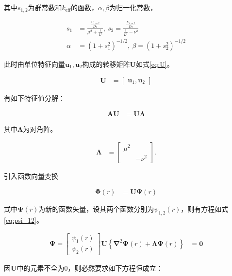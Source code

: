 其中$s_{1,2}$为群常数和$k_\mathrm{eff}$的函数，$\alpha,\beta$为归一化常数，

\begin{align}
    s_1 &= \frac{\frac{\Sigma_{1\rightarrow 2}}{D_2}}{\mu^2 + \frac{1}{L^2}},\ s_2 = \frac{\frac{\Sigma_{1\rightarrow 2}}{D_2}}{\frac{1}{L^2}-\nu^2} \\
    \alpha &= \left(1+s_1^2\right)^{-1/2},\ \beta = \left(1+s_2^2\right)^{-1/2}
\end{align}

此时由单位特征向量$\pmb{u}_1,\pmb{u}_2$构成的转移矩阵$\pmb{U}$如式\ref{eq:U}。

\begin{align}
    \label{eq:U}
    \pmb{U} &= \begin{bmatrix}
        \pmb{u}_1, \pmb{u}_2
    \end{bmatrix}
\end{align}

有如下特征值分解：

\begin{align}
    \pmb{A}\pmb{U} &= \pmb{U}\pmb{\Lambda}
\end{align}

其中$\pmb{\Lambda}$为对角阵。

\begin{align}
    \pmb{\Lambda} &= \begin{bmatrix}
        \mu^2 & \\
         & -\nu^2
    \end{bmatrix}.
\end{align}

引入函数向量变换

\begin{align}
    \label{eq:phi_psi}
    \pmb{\Phi}(r) &= \pmb{U}\pmb{\Psi}(r)
\end{align}

式中$\pmb{\Psi}(r)$为新的函数矢量，设其两个函数分别为$\psi_{1,2}(r)$，则有方程如式\ref{eq:psi_12}。

\begin{align}
    \pmb{\Psi} = \begin{bmatrix}
        \psi_1(r) \\
        \psi_2(r)
    \end{bmatrix}
    \label{eq:psi_12}
    \pmb{U}\left\{\pmb{\nabla}^2\pmb{\Psi}(r)+\pmb{\Lambda}\pmb{\Psi}(r)\right\} &= \pmb{0}
\end{align}

因$\pmb{U}$中的元素不全为$0$，则必然要求如下方程恒成立：

